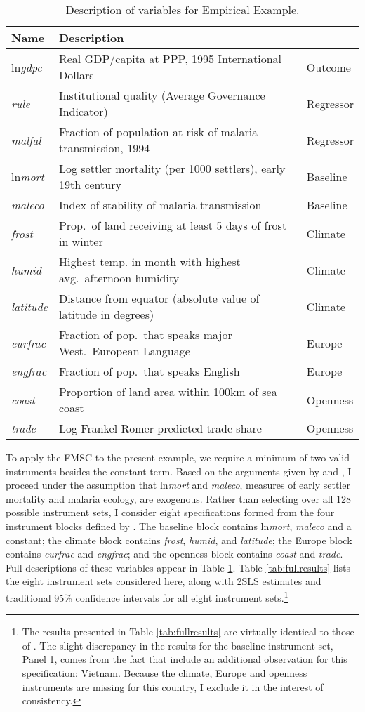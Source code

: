 \begin{table}[!tbp]
\small
\centering
\begin{tabular}{lll}
\hline \hline
Name& Description &\\
\hline
ln\emph{gdpc}&Real GDP/capita at PPP, 1995 International Dollars &Outcome\\
\emph{rule}&Institutional quality (Average Governance Indicator)&Regressor\\
\emph{malfal}&Fraction of population at risk of malaria transmission, 1994&Regressor\\
ln\emph{mort}&Log settler mortality (per 1000 settlers), early 19th century&Baseline\\
\emph{maleco}&Index of stability of malaria transmission&Baseline\\
\emph{frost}&Prop.\ of land receiving at least 5 days of frost in winter&Climate\\
\emph{humid}&Highest temp. in month with highest avg.\ afternoon humidity&Climate\\
\emph{latitude}&Distance from equator (absolute value of latitude in degrees)&Climate \\
\emph{eurfrac}&Fraction of pop.\ that speaks major West.\ European Language&Europe \\
\emph{engfrac}&Fraction of pop.\ that speaks English&Europe\\
\emph{coast}&Proportion of land area within 100km of sea coast&Openness\\
\emph{trade}&Log Frankel-Romer predicted trade share&Openness\\
\hline
\end{tabular}
\caption{Description of variables for Empirical Example.}
\label{tab:desc}
\end{table}

To apply the FMSC to the present example, we require a minimum of two valid instruments besides the constant term. 
Based on the arguments given by \cite{Acemoglu} and \cite{Sachs}, I proceed under the assumption that ln\emph{mort} and \emph{maleco}, measures of early settler mortality and malaria ecology, are exogenous.
Rather than selecting over all 128 possible instrument sets, I consider eight specifications formed from the four instrument blocks defined by \cite{Carstensen2006}.
The baseline block contains ln\emph{mort}, \emph{maleco} and a constant; the climate block contains \emph{frost}, \emph{humid}, and \emph{latitude}; the Europe block contains \emph{eurfrac} and \emph{engfrac}; and the openness block contains \emph{coast} and \emph{trade}. 
Full descriptions of these variables appear in Table \ref{tab:desc}.
Table \ref{tab:fullresults} lists the eight instrument sets considered here, along with 2SLS estimates and traditional 95\% confidence intervals for all eight instrument sets.\footnote{The results presented in Table \ref{tab:fullresults} are virtually identical to those of \cite{Carstensen2006}. The slight discrepancy in the results for the baseline instrument set, Panel 1, comes from the fact that \cite{Carstensen2006} include an additional observation for this specification: Vietnam. Because the climate, Europe and openness instruments are missing for this country, I exclude it in the interest of consistency.}


